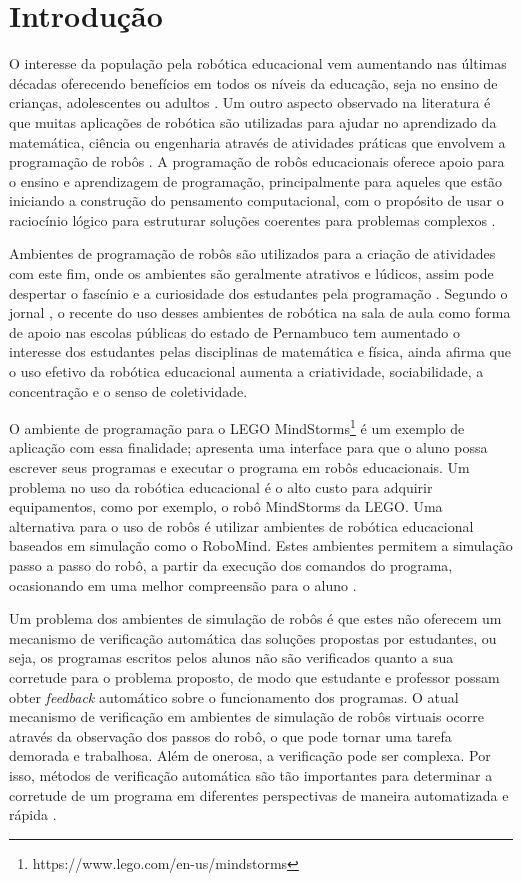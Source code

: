 \chapter{Introdução}

O interesse da população pela robótica educacional vem aumentando nas últimas décadas oferecendo benefícios em todos os níveis da educação, seja no ensino de crianças, adolescentes ou adultos \cite{alimisis}. Um outro aspecto observado na literatura é que muitas aplicações de robótica são utilizadas para ajudar no aprendizado da matemática, ciência ou engenharia através de atividades práticas que envolvem a programação de robôs \cite{Benitti2012}. A programação de robôs educacionais oferece apoio para o ensino e aprendizagem de programação, principalmente para aqueles que estão iniciando a construção do pensamento computacional, com o propósito de usar o raciocínio lógico para estruturar soluções coerentes para problemas complexos \cite{Bombasar2015}.

Ambientes de programação de robôs são utilizados para a criação de atividades com este fim, onde os ambientes são geralmente atrativos e lúdicos, assim pode despertar o fascínio e a curiosidade dos estudantes pela programação \cite{ESILVA}. Segundo o jornal , o recente do uso desses ambientes de robótica na sala de aula como forma de apoio nas escolas públicas do estado de Pernambuco tem aumentado o interesse dos estudantes pelas disciplinas de matemática e física, ainda afirma que o uso efetivo da robótica educacional aumenta a criatividade, sociabilidade, a concentração e o senso de coletividade.

O ambiente de programação para o LEGO MindStorms\footnote{https://www.lego.com/en-us/mindstorms} é um exemplo de aplicação com essa finalidade; apresenta uma interface para que o aluno possa escrever seus programas e executar o programa em robôs educacionais. Um problema no uso da robótica educacional é o alto custo para adquirir equipamentos, como por exemplo, o robô MindStorms da LEGO. Uma alternativa para o uso de robôs é utilizar ambientes de robótica educacional baseados em simulação como o RoboMind. Estes ambientes permitem a simulação passo a passo do robô, a partir da execução dos comandos do programa, ocasionando em uma melhor compreensão para o aluno \cite{Lessa2015}. 

Um problema dos ambientes de simulação de robôs é que estes não oferecem um mecanismo de verificação automática das soluções propostas por estudantes, ou seja, os programas escritos pelos alunos não são verificados quanto a sua corretude para o problema proposto, de modo que estudante e professor possam obter \textit{feedback} automático sobre o funcionamento dos programas. O atual mecanismo de verificação em ambientes de simulação de robôs virtuais ocorre através da observação dos passos do robô, o que pode tornar uma tarefa demorada e trabalhosa. Além de onerosa, a verificação pode ser complexa. Por isso, métodos de verificação automática são tão importantes para determinar a corretude de um programa em diferentes perspectivas de maneira automatizada e rápida \cite{Duarte}. 

